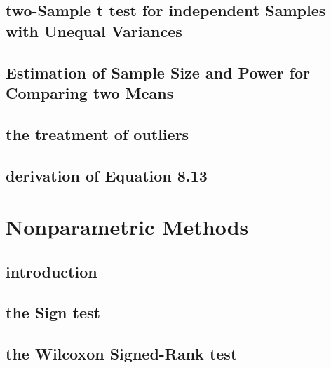 \documentclass[12pt,]{article}
\begin{document}
\hypertarget{two-sample-t-test-for-independent-samples-with-unequal-variances}{%
\subsection{two-Sample t test for independent Samples with Unequal
Variances}\label{two-sample-t-test-for-independent-samples-with-unequal-variances}}

\hypertarget{estimation-of-sample-size-and-power-for-comparing-two-means}{%
\subsection{Estimation of Sample Size and Power for Comparing two
Means}\label{estimation-of-sample-size-and-power-for-comparing-two-means}}

\hypertarget{the-treatment-of-outliers}{%
\subsection{the treatment of outliers}\label{the-treatment-of-outliers}}

\hypertarget{derivation-of-equation-8.13}{%
\subsection{derivation of Equation
8.13}\label{derivation-of-equation-8.13}}

\hypertarget{nonparametric-methods}{%
\section{Nonparametric Methods}\label{nonparametric-methods}}

\hypertarget{introduction-5}{%
\subsection{introduction}\label{introduction-5}}

\hypertarget{the-sign-test}{%
\subsection{the Sign test}\label{the-sign-test}}

\hypertarget{the-wilcoxon-signed-rank-test}{%
\subsection{the Wilcoxon Signed-Rank
test}\label{the-wilcoxon-signed-rank-test}}
\end{document}
